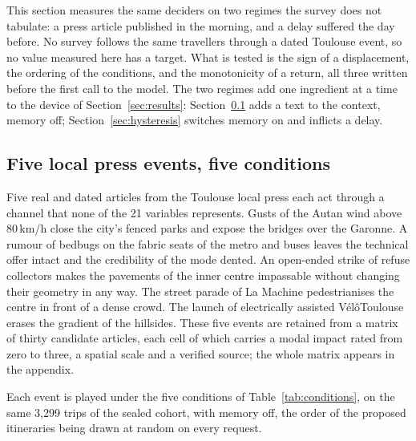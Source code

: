 This section measures the same deciders on two regimes the survey does not tabulate: a press article published in the morning, and a delay suffered the day before. No survey follows the same travellers through a dated Toulouse event, so no value measured here has a target. What is tested is the sign of a displacement, the ordering of the conditions, and the monotonicity of a return, all three written before the first call to the model. The two regimes add one ingredient at a time to the device of Section~\ref{sec:results}: Section~\ref{sec:press} adds a text to the context, memory off; Section~\ref{sec:hysteresis} switches memory on and inflicts a delay.

\subsection{Five local press events, five conditions}
\label{sec:press}

Five real and dated articles from the Toulouse local press each act through a channel that none of the 21 variables represents. Gusts of the Autan wind above 80\,km/h close the city's fenced parks and expose the bridges over the Garonne. A rumour of bedbugs on the fabric seats of the metro and buses leaves the technical offer intact and the credibility of the mode dented. An open-ended strike of refuse collectors makes the pavements of the inner centre impassable without changing their geometry in any way. The street parade of La Machine pedestrianises the centre in front of a dense crowd. The launch of electrically assisted V\'el\^oToulouse erases the gradient of the hillsides. These five events are retained from a matrix of thirty candidate articles, each cell of which carries a modal impact rated from zero to three, a spatial scale and a verified source; the whole matrix appears in the appendix.  %

Each event is played under the five conditions of Table~\ref{tab:conditions}, on the same 3{,}299 trips of the sealed cohort, with memory off, the order of the proposed itineraries being drawn at random on every request.

